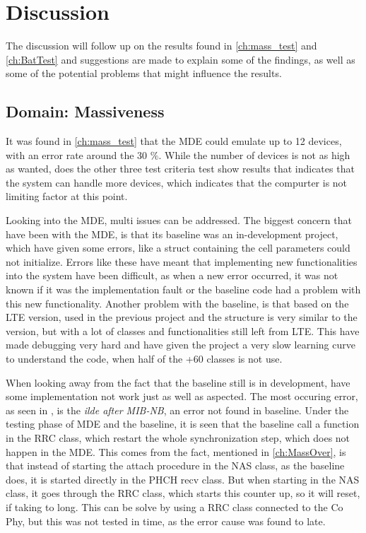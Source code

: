 \chapter{Discussion}
The discussion will follow up on the results found in \autoref{ch:mass_test} and \autoref{ch:BatTest} and suggestions are made to explain some of the findings, as well as some of the potential problems that might influence the results. 

\section{Domain: Massiveness}
It was found in \autoref{ch:mass_test} that the MDE could emulate up to 12 devices, with an error rate around the 30 $\%$. While the number of  devices is not as high as wanted, does the other three test criteria test show results that indicates that the system can handle more devices, which indicates that the compurter is not limiting factor at this point. 

Looking into the MDE, multi issues can be addressed. The biggest concern that have been with the MDE, is that its baseline was an in-development project, which have given some errors, like a struct containing the cell parameters could not initialize. Errors like these have meant that implementing new functionalities into the system have been difficult, as when a new error occurred, it was not known if it was the implementation fault or the baseline code had a problem with this new functionality. Another problem with the baseline, is that based on the LTE version, used in the previous project and the structure is very similar to the version, but with a lot of classes and functionalities still left from LTE. This have made debugging very hard and have given the project a very slow learning curve to understand the code, when half of the +60 classes is not use.

When looking away from the fact that the baseline still is in development, have some implementation not work just as well as aspected. The most occuring error, as seen in , is the \textit{ilde after MIB-NB}, an error not found in baseline. Under the testing phase of MDE and the baseline, it is seen that the baseline call a function in the RRC class, which restart the whole synchronization step, which does not happen in the MDE. This comes from the fact, mentioned in \autoref{ch:MassOver}, is that instead of starting the attach procedure in the NAS class, as the baseline does, it is started directly in the PHCH recv class. But when starting in the NAS class, it goes through the RRC class, which starts this counter up, so it will reset, if taking to long. This can be solve by using a RRC class connected to the Co Phy, but this was not tested in time, as the error cause was found to late.

